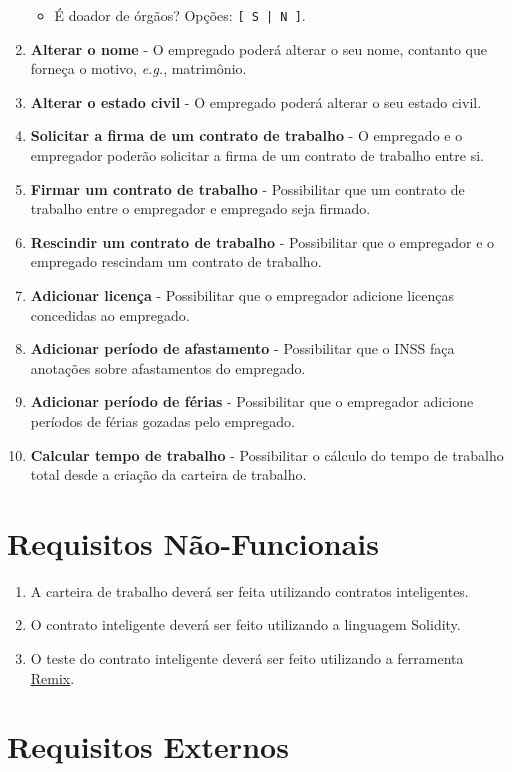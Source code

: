 \documentclass[a4paper,10pt]{article}
\begin{document}
\begin{enumerate}
\begin{itemize}
      \item É doador de órgãos? Opções: \texttt{[ S | N ]}.
    \end{itemize}
  \item \textbf{Alterar o nome} - O empregado poderá alterar o seu nome, contanto que forneça o motivo, \emph{e.g.}, matrimônio.
  \item \textbf{Alterar o estado civil} - O empregado poderá alterar o seu estado civil.
  \item \textbf{Solicitar a firma de um contrato de trabalho} - O empregado e o empregador poderão solicitar a firma de um contrato de trabalho entre si.
  \item \textbf{Firmar um contrato de trabalho} - Possibilitar que um contrato de trabalho entre o empregador e empregado seja firmado.
  \item \textbf{Rescindir um contrato de trabalho} - Possibilitar que o empregador e o empregado rescindam um contrato de trabalho.
  \item \textbf{Adicionar licença} - Possibilitar que o empregador adicione licenças concedidas ao empregado. 
  \item \textbf{Adicionar período de afastamento} - Possibilitar que o INSS faça anotações sobre afastamentos do empregado.
  \item \textbf{Adicionar período de férias} - Possibilitar que o empregador adicione períodos de férias gozadas pelo empregado.
  \item \textbf{Calcular tempo de trabalho} - Possibilitar o cálculo do tempo de trabalho total desde a criação da carteira de trabalho.
\end{enumerate}

\section{Requisitos Não-Funcionais}
\begin{enumerate}
  \item A carteira de trabalho deverá ser feita utilizando contratos inteligentes.
  \item O contrato inteligente deverá ser feito utilizando a linguagem Solidity.
  \item O teste do contrato inteligente deverá ser feito utilizando a ferramenta \href{https://remix.ethereum.org/}{Remix}.
\end{enumerate}
\section{Requisitos Externos}
\end{document}
